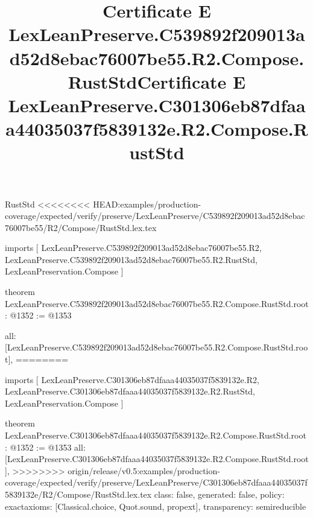 \begin{lexlean}{RustStd}
<<<<<<<< HEAD:examples/production-coverage/expected/verify/preserve/LexLeanPreserve/C539892f209013ad52d8ebac76007be55/R2/Compose/RustStd.lex.tex
\title{Certificate E LexLeanPreserve.C539892f209013ad52d8ebac76007be55.R2.Compose.RustStd}
\begin{coremodule}
imports [
  LexLeanPreserve.C539892f209013ad52d8ebac76007be55.R2,
  LexLeanPreserve.C539892f209013ad52d8ebac76007be55.R2.RustStd,
  LexLeanPreservation.Compose
]

theorem LexLeanPreserve.C539892f209013ad52d8ebac76007be55.R2.Compose.RustStd.root : @1352 := @1353 {
  all: [LexLeanPreserve.C539892f209013ad52d8ebac76007be55.R2.Compose.RustStd.root],
========
\title{Certificate E LexLeanPreserve.C301306eb87dfaaa44035037f5839132e.R2.Compose.RustStd}
\begin{coremodule}
imports [
  LexLeanPreserve.C301306eb87dfaaa44035037f5839132e.R2,
  LexLeanPreserve.C301306eb87dfaaa44035037f5839132e.R2.RustStd,
  LexLeanPreservation.Compose
]

theorem LexLeanPreserve.C301306eb87dfaaa44035037f5839132e.R2.Compose.RustStd.root : @1352 := @1353 {
  all: [LexLeanPreserve.C301306eb87dfaaa44035037f5839132e.R2.Compose.RustStd.root],
>>>>>>>> origin/release/v0.5:examples/production-coverage/expected/verify/preserve/LexLeanPreserve/C301306eb87dfaaa44035037f5839132e/R2/Compose/RustStd.lex.tex
  class: false,
  generated: false,
  policy: exact{axioms: [Classical.choice, Quot.sound, propext]},
  transparency: semireducible
}


\end{coremodule}}
\end{coremodule}
\end{lexlean}

